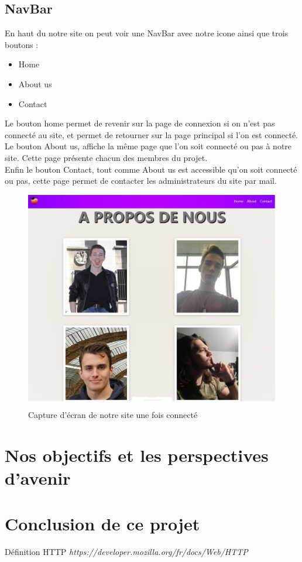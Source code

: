 \documentclass[12pt]{report}
\begin{document}
\subsection{NavBar}
	En haut du notre site on peut voir une NavBar avec notre icone ainsi que trois boutons : \\
	\begin{itemize}
		\item Home
		\item About us
		\item Contact
	\end{itemize}
Le bouton home permet de revenir sur la page de connexion si on n'est pas connecté au site, et permet de retourner sur la page principal si l'on est connecté.\\
Le bouton About us, affiche la même page que l'on soit connecté ou pas à notre site. Cette page présente chacun des membres du projet.\\
Enfin le bouton Contact, tout comme About us est accessible qu'on soit connecté ou pas, cette page permet de contacter les administrateurs du site par mail.
\begin{figure}[h!]
	\begin{center}
		\includegraphics[scale=0.5]{Aboutus.jpg}
	\end{center}
		\caption{Capture d'écran de notre site une fois connecté}
\end{figure}
\clearpage
\section{Nos objectifs et les perspectives d'avenir}
	
\section{Conclusion de ce projet}

			\begin{thebibliography}{10}
			Définition HTTP
			\emph{https://developer.mozilla.org/fr/docs/Web/HTTP}
			
		\end{thebibliography}
\end{document}
